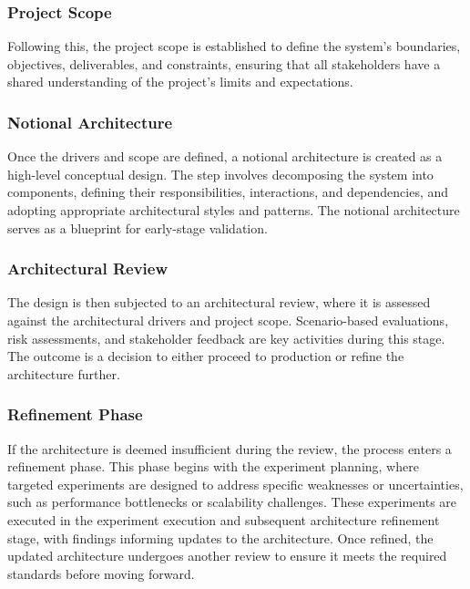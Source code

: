 \subsubsection{Project Scope}

Following this, the project scope is established to define the system's boundaries, objectives, deliverables, and constraints, ensuring that all stakeholders have a shared understanding of the project's limits and expectations.

\subsubsection{Notional Architecture}

Once the drivers and scope are defined, a notional architecture is created as a high-level conceptual design. The step involves decomposing the system into components, defining their responsibilities, interactions, and dependencies, and adopting appropriate architectural styles and patterns. The notional architecture serves as a blueprint for early-stage validation.

\subsubsection{Architectural Review}

The design is then subjected to an architectural review, where it is assessed against the architectural drivers and project scope. Scenario-based evaluations, risk assessments, and stakeholder feedback are key activities during this stage. The outcome is a decision to either proceed to production or refine the architecture further.

\subsubsection{Refinement Phase}

If the architecture is deemed insufficient during the review, the process enters a refinement phase. This phase begins with the experiment planning, where targeted experiments are designed to address specific weaknesses or uncertainties, such as performance bottlenecks or scalability challenges. These experiments are executed in the experiment execution and subsequent architecture refinement stage, with findings informing updates to the architecture. Once refined, the updated architecture undergoes another review to ensure it meets the required standards before moving forward.


